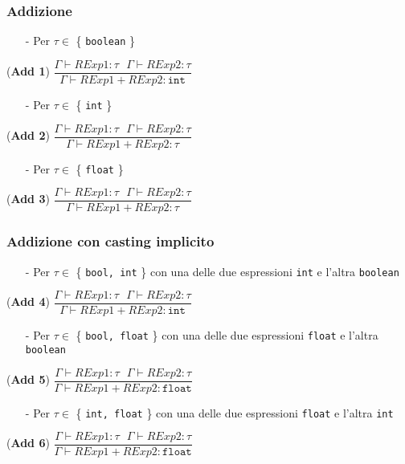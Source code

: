 \documentclass[12pt]{article}
\begin{document}
\subsubsection*{Addizione}

\begin{center}

\begin{itemize}
\item[-] Per $\tau \in$ \{ \texttt{boolean} \}
\end{itemize}
\noindent(\textbf{Add 1})
$\dfrac{\Gamma \vdash RExp1:\tau\ \ \ \Gamma \vdash RExp2:\tau}{\Gamma \vdash RExp1\ \texttt{+}\ RExp2:\texttt{int}}$\\[0.1in]

\begin{itemize}
\item[-] Per $\tau \in$ \{ \texttt{int} \}
\end{itemize}
\noindent(\textbf{Add 2})
$\dfrac{\Gamma \vdash RExp1:\tau\ \ \ \Gamma \vdash RExp2:\tau}{\Gamma \vdash RExp1\ \texttt{+}\ RExp2:\tau}$\\[0.1in]

\begin{itemize}
\item[-] Per $\tau \in$ \{ \texttt{float} \}
\end{itemize}
\noindent(\textbf{Add 3})
$\dfrac{\Gamma \vdash RExp1:\tau\ \ \ \Gamma \vdash RExp2:\tau}{\Gamma \vdash RExp1\ \texttt{+}\ RExp2:\tau}$\\[0.1in]
\end{center}
\subsubsection*{Addizione con casting implicito}
\begin{center}
\begin{itemize}
\item[-] Per $\tau \in$ \{ \texttt{bool, int} \} con una delle due espressioni \texttt{int} e l'altra \texttt{boolean}
\end{itemize}
\noindent(\textbf{Add 4})
$\dfrac{\Gamma \vdash RExp1:\tau\ \ \ \Gamma \vdash RExp2:\tau}{\Gamma \vdash RExp1\ \texttt{+}\ RExp2:\texttt{int}}$\\[0.1in]
\begin{itemize}
\item[-] Per $\tau \in$ \{ \texttt{bool, float} \} con una delle due espressioni \texttt{float} e l'altra \texttt{boolean}
\end{itemize}

\noindent(\textbf{Add 5})
$\dfrac{\Gamma \vdash RExp1:\tau\ \ \ \Gamma \vdash RExp2:\tau}{\Gamma \vdash RExp1\ \texttt{+}\ RExp2:\texttt{float}}$\\[0.1in]
\begin{itemize}
\item[-] Per $\tau \in$ \{ \texttt{int, float} \} con una delle due espressioni \texttt{float} e l'altra \texttt{int}
\end{itemize}
\noindent(\textbf{Add 6})
$\dfrac{\Gamma \vdash RExp1:\tau\ \ \ \Gamma \vdash RExp2:\tau}{\Gamma \vdash RExp1\ \texttt{+}\ RExp2:\texttt{float}}$\\[0.1in]
\end{center}
\end{document}
